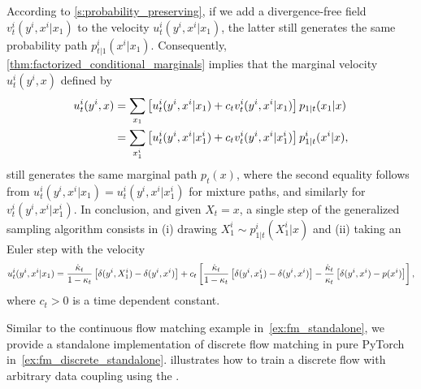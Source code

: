 \documentclass{fairmeta}
\renewcommand{\eqref}[1]{\labelcref{#1}}
\numberwithin{equation}{section}
\begin{document}
According to \cref{s:probability_preserving}, if we add a divergence-free field $v^i_t(y^i,x^i|x_1)$  to the velocity $u_t^i(y^i,x^i|x_1)$,  the latter still generates the same probability path $p_{t|1}^i(x^i|x_1)$. Consequently, \cref{thm:factorized_conditional_marginals} implies that the marginal velocity  $u_t^i(y^i,x)$ defined by
\begin{align*}
    u_t^i(y^i,x) &= \sum_{x_1} \left [u_t^i(y^i,x^i|x_1) + c_t v_t^i(y^i,x^i|x_1)\right ]p_{1|t}(x_1|x) \\
    &= \sum_{x_1^i}\left [u_t^i(y^i,x^i|x^i_1) + c_t v_t^i(y^i,x^i|x^i_1)\right ]p_{1|t}^i(x^i|x),
\end{align*}
still generates the same marginal path $p_t(x)$, where the second equality follows from $u_t^i(y^i,x^i|x_1)=u_t^i(y^i,x^i|x^i_1)$ for mixture paths, and similarly for $v_t^i(y^i,x^i|x^i_1)$.
In conclusion, and given $X_t=x$, a single step of the generalized sampling algorithm consists in (i) drawing $X_1^i \sim p_{1|t}^i(X_1^i|x)$ and (ii) taking an Euler step  \eqref{e:ctmc_euler} with the velocity 
\begin{equation*}
    u_t^i(y^i,x^i|x_1)=\frac{\dot{\kappa}_t}{1-\kappa_t}\left [\delta(y^i,X_1^i) - \delta(y^i,x^i)\right ] + c_t\left [\frac{\dot{\kappa}_t}{1-\kappa_t}\left [\delta(y^i,x_1^i) - \delta(y^i,x^i)\right ] - \frac{\dot{\kappa}_t}{\kappa_t}\left [\delta(y^i,x^i)-p(x^i)\right ] \right ],
\end{equation*}  
where $c_t>0$ is a time dependent constant.


Similar to the continuous flow matching example in~\cref{ex:fm_standalone}, we provide a standalone implementation of discrete flow matching in pure PyTorch in~\cref{ex:fm_discrete_standalone}.  illustrates how to train a discrete flow with arbitrary data coupling using the \fmlibrary{}. 
\end{document}
